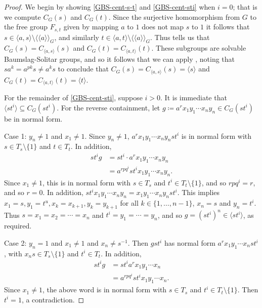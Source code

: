 \documentclass[11pt]{amsart}
\theoremstyle{definition}
\numberwithin{theorem}{section}
\begin{document}
	\begin{proof}
			We begin by showing \eqref{GBS-cent-s-t} and \eqref{GBS-cent-sti} when \(i = 0\); that is we compute
		\(C_G(s)\) and \(C_G(t)\).  
Since the surjective homomorphism from $G$ to the free group $F_{s,t}$ given by mapping $a$ to $1$ does not map $s$ to $1$ it follows that    
\(s \in
		\langle a, s \rangle \setminus \langle \langle a \rangle \rangle_G\), and similarly  
\(t \in \langle a, t \rangle \setminus \langle \langle a \rangle
		\rangle_G\).
Thus
		\cite[Proposition 2.3]{BarkThesis} tells us that 
\(C_G(s) = C_{\langle a, s \rangle}(s)\) and
		\(C_G(t) = C_{\langle a, t \rangle}(t)\). These subgroups are solvable
		Baumslag-Solitar groups, and so it follows that we can apply
		\cite[Proposition 2.15]{BarkThesis}, noting that \(s a^k = a^{pk} s
		\neq a^k s\) to conclude that \(C_G(s) = C_{\langle a, s \rangle}(s) =
		\langle s \rangle\) and \(C_G(t) = C_{\langle a, t \rangle}(t) =
		\langle t \rangle\).

		For the remainder of \eqref{GBS-cent-sti}, suppose \(i > 0\).
		It is immediate that \(\langle st^i \rangle \subseteq
		C_G(st^i)\).  For the reverse containment, let \(g \coloneqq a^r x_1 y_1 \cdots x_n
		y_n \in C_G(st^i)\) be in normal form.

		Case 1: \(y_n \neq 1\) and \(x_1 \neq 1\). Since \(y_n \neq 1\), 
		\(a^r x_1 y_1 \cdots x_n y_n st^i\) is in normal form with
		\(s \in T_s \setminus \{1\}\) and \(t \in T_t\). In
		addition,
		\begin{align*}
				st^i g & = s t^i \cdot a^r x_1 y_1 \cdots x_n y_n \\ 
			& = a^{r pq^i} st^i x_1 y_1 \cdots x_n y_n. 
		\end{align*}
		Since \(x_1 \neq 1\), this is in normal form with \(s \in T_s\) and
		\(t^i \in T_t \setminus \{1\}\), and so
		\(rpq^i = r\), and so \(r = 0\). In addition,
		\(st^i x_1 y_1 \cdots x_n y_n = x_1 y_1 \cdots x_n y_n st^i\). This
		implies \(x_1 = s, y_1 = t^u, x_k = x_{k + 1}, y_k = y_{k + 1}\)
		for all \(k \in \{1, \ldots, n - 1\}\), \(x_n = s\) and \(y_n = t^i\).
		Thus \(s = x_1 = x_2 = \cdots = x_n\) and \(t^i = y_1 = \cdots 
		= y_n\), and so \(g= (st^i)^n \in
		\langle st^i \rangle\), as required.
			
		Case 2: \(y_n = 1\) and \(x_1 \neq 1\) and \(x_n \neq s^{-1}\). 
		Then \(g st^i\) has normal form
		\(a^r x_1 y_1 \cdots x_n st^i\), with \(x_n s \in T_s \setminus \{1\}\)
		and \(t^i \in T_t\). In addition,
		\begin{align*}
			st^i g & = st^i a^r x_1 y_1 \cdots x_n \\
				   & = a^{r pq^i} st^i x_1 y_1 \cdots x_n.
		\end{align*}
		Since \(x_1 \neq 1\), the above word is in normal form
		with \(s \in T_s\) and \(t^i \in T_t \setminus \{1\}\).
		Then \(t^i = 1\), a contradiction.


\end{proof}
\end{document}
